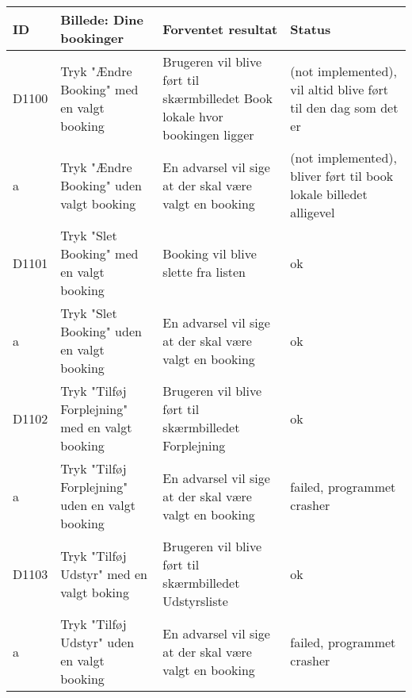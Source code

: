 \begin{tabularx}{\textwidth}{ |X|X|X|X| }
\hline
	ID & Billede: Dine bookinger  & Forventet resultat & Status\\ 
\hline
	D1100 & Tryk "Ændre Booking" med en valgt booking & Brugeren vil blive ført til skærmbilledet Book lokale hvor bookingen ligger &(not implemented), vil altid blive ført til den dag som det er \\
\hline
	a & Tryk "Ændre Booking" uden valgt booking & En advarsel vil sige at der skal være valgt en booking &(not implemented), bliver ført til book lokale billedet alligevel \\
\hline
	D1101 & Tryk "Slet Booking" med en valgt booking & Booking vil blive slette fra listen & ok \\
\hline
	a & Tryk "Slet Booking" uden en valgt booking & En advarsel vil sige at der skal være valgt en booking & ok \\
\hline
	D1102 & Tryk "Tilføj Forplejning" med en valgt booking & Brugeren vil blive ført til skærmbilledet Forplejning & ok \\
\hline
	a &  Tryk "Tilføj Forplejning" uden en valgt booking & En advarsel vil sige at der skal være valgt en booking &failed, programmet crasher \\
\hline
	D1103 & Tryk "Tilføj Udstyr" med en valgt boking & Brugeren vil blive ført til skærmbilledet Udstyrsliste & ok \\
\hline
	a & Tryk "Tilføj Udstyr" uden en valgt booking & En advarsel vil sige at der skal være valgt en booking & failed, programmet crasher \\
\hline
\end{tabularx}